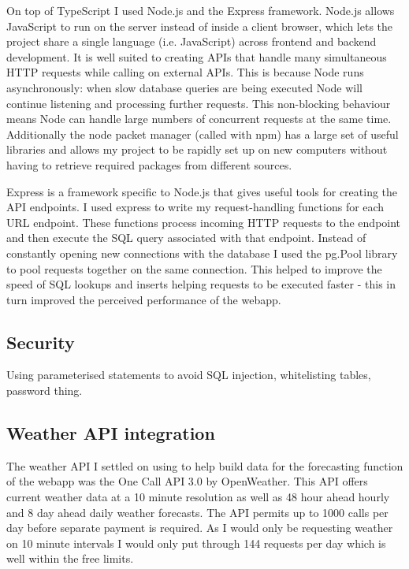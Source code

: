 On top of TypeScript I used Node.js and the Express framework. Node.js allows
JavaScript to run on the server instead of inside a client browser, which lets
the project share a single language (i.e. JavaScript) across frontend and
backend development. It is well suited to creating APIs that handle many
simultaneous HTTP requests while calling on external APIs. This is because Node
runs asynchronously: when slow database queries are being executed Node will
continue listening and processing further requests. This non-blocking behaviour
means Node can handle large numbers of concurrent requests at the same time.
Additionally the node packet manager (called with npm) has a large set of useful
libraries and allows my project to be rapidly set up on new computers without
having to retrieve required packages from different sources.

Express is a framework specific to Node.js that gives useful tools for creating
the API endpoints. I used express to write my request-handling functions for
each URL endpoint. These functions process incoming HTTP requests to the
endpoint and then execute the SQL query associated with that endpoint. Instead
of constantly opening new connections with the database I used the pg.Pool
library to pool requests together on the same connection. This helped to improve
the speed of SQL lookups and inserts helping requests to be executed faster -
this in turn improved the perceived performance of the webapp.

\subsection{Security}

Using parameterised statements to avoid SQL injection, whitelisting tables,
password thing.


\subsection{Weather API integration}

The weather API I settled on using to help build data for the forecasting
function of the webapp was the One Call API 3.0 by OpenWeather. This API offers
current weather data at a 10 minute resolution as well as 48 hour ahead hourly
and 8 day ahead daily weather forecasts. The API permits up to 1000 calls per
day before separate payment is required. As I would only be requesting weather
on 10 minute intervals I would only put through 144 requests per day which is
well within the free limits.

